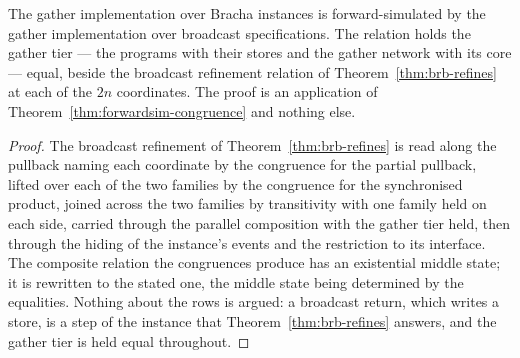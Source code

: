 \begin{theorem}
  \label{thm:gather-low-refines}
  \leanok
  The gather implementation over Bracha instances is forward-simulated by the gather implementation over broadcast specifications.
  The relation holds the gather tier --- the programs with their stores and the gather network with its core --- equal, beside the broadcast refinement relation of Theorem~\ref{thm:brb-refines} at each of the $2n$ coordinates.
  The proof is an application of Theorem~\ref{thm:forwardsim-congruence} and nothing else.
\end{theorem}

\begin{proof}\leanok
  The broadcast refinement of Theorem~\ref{thm:brb-refines} is read along the pullback naming each coordinate by the congruence for the partial pullback, lifted over each of the two families by the congruence for the synchronised product, joined across the two families by transitivity with one family held on each side, carried through the parallel composition with the gather tier held, then through the hiding of the instance's events and the restriction to its interface.
  The composite relation the congruences produce has an existential middle state; it is rewritten to the stated one, the middle state being determined by the equalities.
  Nothing about the rows is argued: a broadcast return, which writes a store, is a step of the instance that Theorem~\ref{thm:brb-refines} answers, and the gather tier is held equal throughout.
\end{proof}
